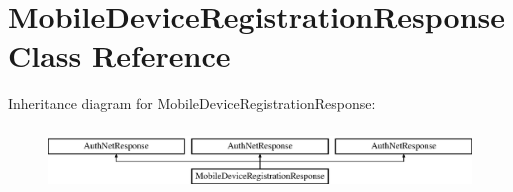 \hypertarget{interface_mobile_device_registration_response}{
\section{MobileDeviceRegistrationResponse Class Reference}
\label{interface_mobile_device_registration_response}
}
Inheritance diagram for MobileDeviceRegistrationResponse:\begin{figure}[H]
\begin{center}
\leavevmode
\includegraphics[height=1.704718cm]{interface_mobile_device_registration_response}
\end{center}
\end{figure}
